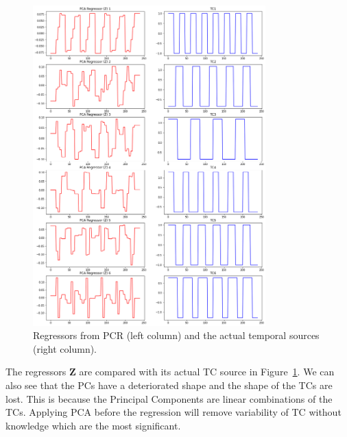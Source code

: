 \documentclass[11pt]{article}
\def\*#1{\mathbf{#1}}
\begin{document}
    \begin{figure}[H]
        \begin{center}
            \includegraphics[width=0.8\textwidth]{../plots/2_5_PCAreg_vs_TC}
        \caption{Regressors from PCR (left column) and the actual temporal sources (right column).}
        \label{fig:z_vs_tc}
        \end{center}
    \end{figure}

The regressors $\*Z$ are compared with its actual TC source in Figure~\ref{fig:z_vs_tc}. We can also see that the PCs have a deteriorated shape and the shape of the TCs are lost. This is because the Principal Components are linear combinations of the TCs. Applying PCA before the regression will remove variability of TC without knowledge which are the most significant.
\end{document}
